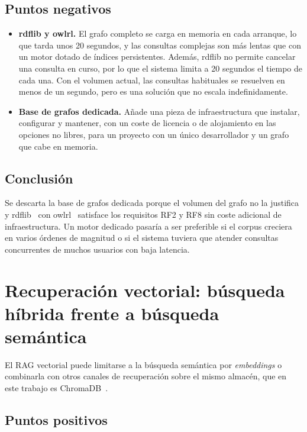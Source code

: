 \documentclass[11pt, a4paper]{report}
\begin{document}
	\subsection{Puntos negativos}

	\begin{itemize}
		\item \textbf{rdflib y owlrl.} El grafo completo se carga en memoria en cada arranque, lo que tarda unos 20 segundos, y las consultas complejas son más lentas que con un motor dotado de índices persistentes. Además, rdflib no permite cancelar una consulta en curso, por lo que el sistema limita a 20 segundos el tiempo de cada una. Con el volumen actual, las consultas habituales se resuelven en menos de un segundo, pero es una solución que no escala indefinidamente.
		\item \textbf{Base de grafos dedicada.} Añade una pieza de infraestructura
		que instalar, configurar y mantener, con un coste de licencia o de
		alojamiento en las opciones no libres, para un proyecto con un único desarrollador
		y un grafo que cabe en memoria.
	\end{itemize}

	\subsection{Conclusión}

	Se descarta la base de grafos dedicada porque el volumen del grafo no la justifica y rdflib~\cite{rdflib} con owlrl~\cite{owlrl} satisface los requisitos RF2 y RF8 sin coste adicional de
	infraestructura. Un motor dedicado pasaría a ser preferible si el corpus
	creciera en varios órdenes de magnitud o si el sistema tuviera que atender
	consultas concurrentes de muchos usuarios con baja latencia.

	\section{Recuperación vectorial: búsqueda híbrida frente a búsqueda semántica}
	\label{sec:alt-recuperacion}

	El RAG vectorial puede limitarse a la búsqueda semántica por
	\textit{embeddings} o combinarla con otros canales de recuperación sobre el
	mismo almacén, que en este trabajo es
	ChromaDB~\cite{chromadb}.

	\subsection{Puntos positivos}
\end{document}
